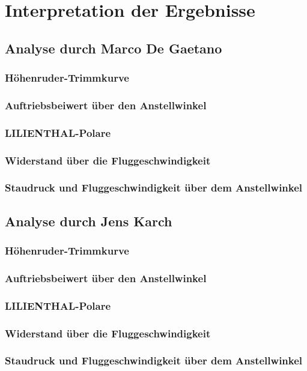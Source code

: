 \chapter{Interpretation der Ergebnisse}
\label{chapter:interpretation}

\section{Analyse durch Marco De Gaetano}
\subsection{Höhenruder-Trimmkurve}
\subsection{Auftriebsbeiwert über den Anstellwinkel}
\subsection{LILIENTHAL-Polare}
\subsection{Widerstand über die Fluggeschwindigkeit}
\subsection{Staudruck und Fluggeschwindigkeit über dem Anstellwinkel}
\newpage
\section{Analyse durch Jens Karch}
\subsection{Höhenruder-Trimmkurve}
\subsection{Auftriebsbeiwert über den Anstellwinkel}
\subsection{LILIENTHAL-Polare}
\subsection{Widerstand über die Fluggeschwindigkeit}
\subsection{Staudruck und Fluggeschwindigkeit über dem Anstellwinkel}
\newpage
